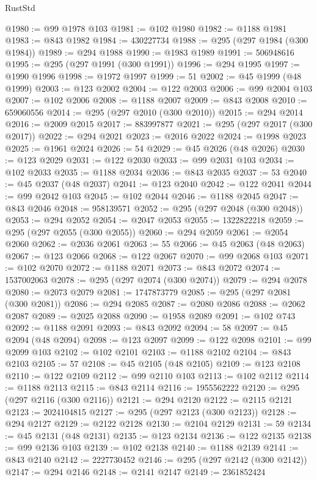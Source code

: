 \begin{lexlean}{RustStd}
\begin{coremodule}
{\begin{coremodule}
{{{{{{{{{{{{{{{{{{{{{{{{{{{{{{{{{@1980 := @99 @1978 @103
@1981 := @102 @1980
@1982 := @1188 @1981
@1983 := @843 @1982
@1984 := 430227734
@1988 := @295 (@297 @1984 (@300 @1984))
@1989 := @294 @1988
@1990 := @1983 @1989
@1991 := 506948616
@1995 := @295 (@297 @1991 (@300 @1991))
@1996 := @294 @1995
@1997 := @1990 @1996
@1998 := @1972 @1997
@1999 := 51
@2002 := @45 @1999 (@48 @1999)
@2003 := @123 @2002
@2004 := @122 @2003
@2006 := @99 @2004 @103
@2007 := @102 @2006
@2008 := @1188 @2007
@2009 := @843 @2008
@2010 := 659060556
@2014 := @295 (@297 @2010 (@300 @2010))
@2015 := @294 @2014
@2016 := @2009 @2015
@2017 := 883997877
@2021 := @295 (@297 @2017 (@300 @2017))
@2022 := @294 @2021
@2023 := @2016 @2022
@2024 := @1998 @2023
@2025 := @1961 @2024
@2026 := 54
@2029 := @45 @2026 (@48 @2026)
@2030 := @123 @2029
@2031 := @122 @2030
@2033 := @99 @2031 @103
@2034 := @102 @2033
@2035 := @1188 @2034
@2036 := @843 @2035
@2037 := 53
@2040 := @45 @2037 (@48 @2037)
@2041 := @123 @2040
@2042 := @122 @2041
@2044 := @99 @2042 @103
@2045 := @102 @2044
@2046 := @1188 @2045
@2047 := @843 @2046
@2048 := 958139571
@2052 := @295 (@297 @2048 (@300 @2048))
@2053 := @294 @2052
@2054 := @2047 @2053
@2055 := 1322822218
@2059 := @295 (@297 @2055 (@300 @2055))
@2060 := @294 @2059
@2061 := @2054 @2060
@2062 := @2036 @2061
@2063 := 55
@2066 := @45 @2063 (@48 @2063)
@2067 := @123 @2066
@2068 := @122 @2067
@2070 := @99 @2068 @103
@2071 := @102 @2070
@2072 := @1188 @2071
@2073 := @843 @2072
@2074 := 1537002063
@2078 := @295 (@297 @2074 (@300 @2074))
@2079 := @294 @2078
@2080 := @2073 @2079
@2081 := 1747873779
@2085 := @295 (@297 @2081 (@300 @2081))
@2086 := @294 @2085
@2087 := @2080 @2086
@2088 := @2062 @2087
@2089 := @2025 @2088
@2090 := @1958 @2089
@2091 := @102 @743
@2092 := @1188 @2091
@2093 := @843 @2092
@2094 := 58
@2097 := @45 @2094 (@48 @2094)
@2098 := @123 @2097
@2099 := @122 @2098
@2101 := @99 @2099 @103
@2102 := @102 @2101
@2103 := @1188 @2102
@2104 := @843 @2103
@2105 := 57
@2108 := @45 @2105 (@48 @2105)
@2109 := @123 @2108
@2110 := @122 @2109
@2112 := @99 @2110 @103
@2113 := @102 @2112
@2114 := @1188 @2113
@2115 := @843 @2114
@2116 := 1955562222
@2120 := @295 (@297 @2116 (@300 @2116))
@2121 := @294 @2120
@2122 := @2115 @2121
@2123 := 2024104815
@2127 := @295 (@297 @2123 (@300 @2123))
@2128 := @294 @2127
@2129 := @2122 @2128
@2130 := @2104 @2129
@2131 := 59
@2134 := @45 @2131 (@48 @2131)
@2135 := @123 @2134
@2136 := @122 @2135
@2138 := @99 @2136 @103
@2139 := @102 @2138
@2140 := @1188 @2139
@2141 := @843 @2140
@2142 := 2227730452
@2146 := @295 (@297 @2142 (@300 @2142))
@2147 := @294 @2146
@2148 := @2141 @2147
@2149 := 2361852424
}}}}}}}}}}}}}}}}}}}}}}}}}}}}}}}}}
\end{coremodule}}
\end{coremodule}
\end{lexlean}
